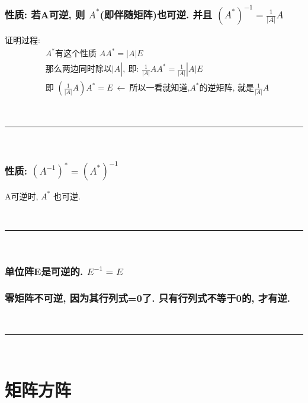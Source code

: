 \documentclass[UTF8]{ctexart}
\begin{document}
\subsubsection{性质: 若A可逆, 则 $A^{*}$(即伴随矩阵)也可逆. 并且 $(A^{*})^{-1} =  \frac{1}{|A| } A$ }


证明过程:
\begin{align*}
		& A^*\text{有这个性质\ }AA^*=|A|E\\
	& \text{那么两边同时除以|}A|,\ \text{即:\ }\frac{1}{|A|}AA^*=\frac{1}{|A|}|A|E\\
	& \text{即\ }\left( \frac{1}{|A|}A \right) A^*=E\ ←\ \text{所以一看就知道,}A^*\text{的逆矩阵,\ 就是}\frac{1}{|A|}A
\end{align*}

~\\
\hrule
~\\

\subsubsection{性质: $\left( A^{-1} \right) ^*=\left( A^* \right) ^{-1}$ }

A可逆时, $A^{*}$ 也可逆.

	
~\\
\hrule
~\\	
	

\subsubsection{单位阵E是可逆的.  $E^{-1} = E $}

\subsubsection{零矩阵不可逆, 因为其行列式=0了. 只有行列式不等于0的, 才有逆.}


	
	
~\\
\hrule
~\\
	
	\section{矩阵方阵}
\end{document}
